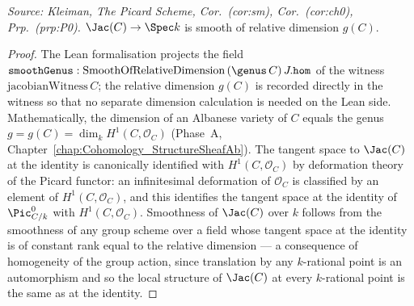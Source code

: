 \begin{theorem}
  \label{thm:Jacobian_smooth_genus}
  \textit{Source: Kleiman, The Picard Scheme, Cor.~(cor:sm), Cor.~(cor:ch0), Prp.~(prp:P0).}
  \(\Jac(C) \to \Spec k\) is smooth of relative dimension \(g(C)\).
\end{theorem}
\begin{proof}

\leanok
  The Lean formalisation projects the field \(\mathtt{smoothGenus} : \mathrm{SmoothOfRelativeDimension}\,(\genus\, C)\,J.\mathtt{hom}\) of the witness \(\mathrm{jacobianWitness}\, C\); the relative dimension \(g(C)\) is recorded directly in the witness so that no separate dimension calculation is needed on the Lean side.
  Mathematically, the dimension of an Albanese variety of \(C\) equals the genus \(g = g(C) = \dim_k H^1(C, \mathcal O_C)\) (Phase~A, Chapter~\ref{chap:Cohomology_StructureSheafAb}). The tangent space to \(\Jac(C)\) at the identity is canonically identified with \(H^1(C, \mathcal O_C)\) by deformation theory of the Picard functor: an infinitesimal deformation of \(\mathcal O_C\) is classified by an element of \(H^1(C, \mathcal O_C)\), and this identifies the tangent space at the identity of \(\Pic^0_{C/k}\) with \(H^1(C, \mathcal O_C)\). Smoothness of \(\Jac(C)\) over \(k\) follows from the smoothness of any group scheme over a field whose tangent space at the identity is of constant rank equal to the relative dimension --- a consequence of homogeneity of the group action, since translation by any \(k\)-rational point is an automorphism and so the local structure of \(\Jac(C)\) at every \(k\)-rational point is the same as at the identity.
\end{proof}
